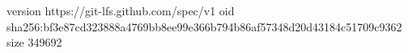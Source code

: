 version https://git-lfs.github.com/spec/v1
oid sha256:bf3e87cd323888a4769bb8ee99e366b794b86af57348d20d43184c51709c9362
size 349692
